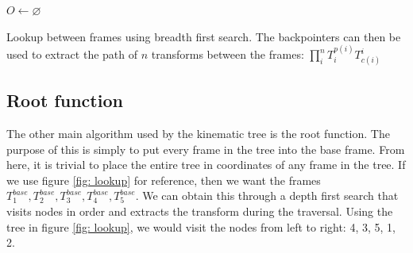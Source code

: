 \begin{algorithm}
	\DontPrintSemicolon
		$O \gets \varnothing$



	\caption{Lookup between frames using breadth first search. The backpointers can then be used to extract the path of $n$ transforms between the frames: $\prod_i^n T_i^{p(i)}T^i_{c(i)}$}
	\label{alg: lookup}
\end{algorithm}

\subsection{Root function}
The other main algorithm used by the kinematic tree is the root function. 
The purpose of this is simply to put every frame in the tree into the base frame. 
From here, it is trivial to place the entire tree in coordinates of any frame in the tree. 
If we use figure \ref{fig: lookup} for reference, then we want the frames $T^{base}_1,T^{base}_2, T^{base}_3, T^{base}_4, T^{base}_5$.
We can obtain this through a depth first search that visits nodes in order and extracts the transform during the traversal. 
Using the tree in figure \ref{fig: lookup}, we would visit the nodes from left to right: 4, 3, 5, 1, 2. 

